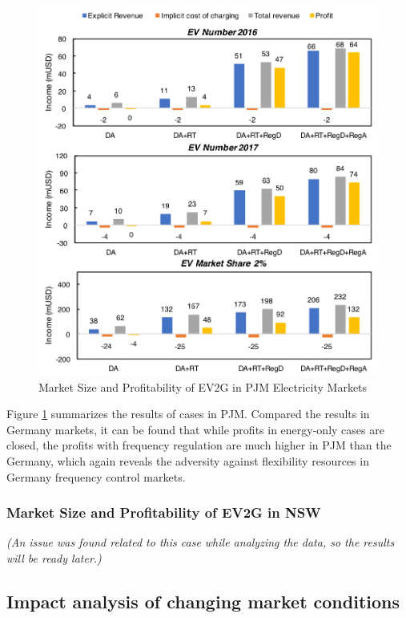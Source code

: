 \begin{figure}[h!]
	\centering
	\includegraphics[width=0.95\linewidth]{Figures/PJM_EV_profit}
	\caption{Market Size and Profitability of EV2G in PJM Electricity Markets}
	\label{fig:PJM_EV}
\end{figure}

Figure \ref{fig:PJM_EV} summarizes the results of cases in PJM. Compared the results in Germany markets, it can be found that while profits in energy-only cases are closed, the profits with frequency regulation are much higher in PJM than the Germany, which again reveals the adversity against flexibility resources in Germany frequency control markets.

 
\subsubsection{Market Size and Profitability of EV2G  in NSW}

\textit{(An issue was found related to this case while analyzing the data, so the results will be ready later.)}



\subsection{Impact analysis of changing market conditions}
\label{sec:impact-market-condition}

